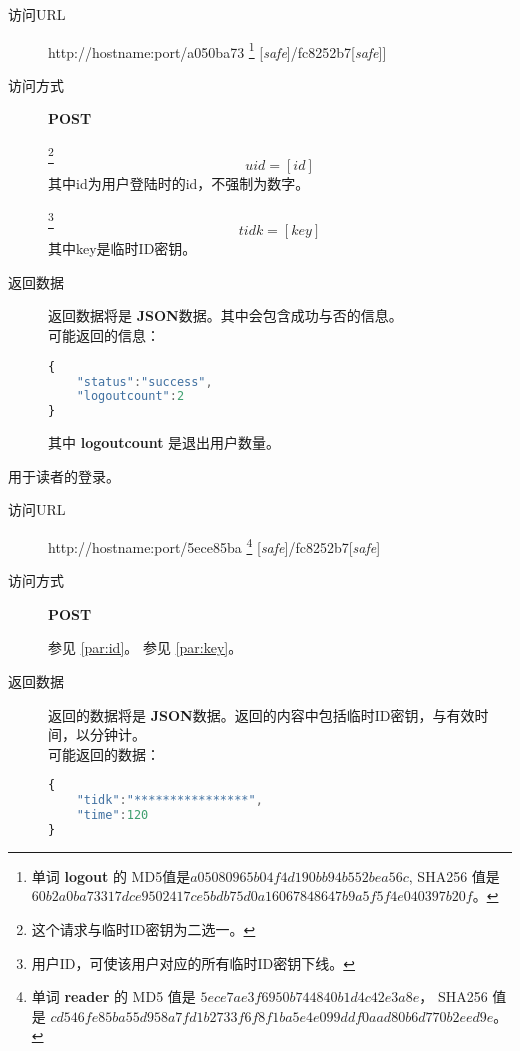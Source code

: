 \documentclass[UTF8]{ctexart}
\def\safe{[\textit{safe}]}
\def\POST{\textbf{POST}}
\def\bfJSON{\textbf{JSON}}
\def\viaurl#1{\item[访问URL] #1}
\def\viareq#1{\item[访问方式] #1}
\def\rtdata{\item[返回数据]}
\begin{document}
    \begin{description}
        \viaurl http://hostname:port/a050ba73
        \footnote{
            单词 \textbf{logout} 的
            MD5值是$a05080965b04f4d190bb94b552bea56c $,
            SHA256 值是
            $60b2a0ba73317dce9502417ce5bdb75d0a16067848647b9a5f5f4e040397b20f$。
        }
        \safe/fc8252b7\safe]
        
        \viareq \POST
        
        \label{par:logout:id}
        \footnote{这个请求与临时ID密钥为二选一。}
        $$uid=[id]$$
        其中id为用户登陆时的id，不强制为数字。
        
        \label{par:logout:tidk}
        \footnote{用户ID，可使该用户对应的所有临时ID密钥下线。}
        $$tidk=[key]$$
        其中key是临时ID密钥。
        
        \rtdata 返回数据将是 \bfJSON 数据。其中会包含成功与否的信息。
        \\可能返回的信息：
        \begin{lstlisting}[language=JavaScript]
{
    "status":"success",
    "logoutcount":2
}
        \end{lstlisting}\label{par:logout:example}
        其中 \textbf{logoutcount} 是退出用户数量。
    \end{description}
    
    
    
    
    
    
		用于读者的登录。
		\begin{description}
            
		\viaurl http://hostname:port/5ece85ba
        \footnote{单词 \textbf{reader} 的
            MD5 值是 
            $5ece7ae3f6950b744840b1d4c42e3a8e$，
            SHA256 值是
            $cd546fe85ba55d958a7fd1b2733f6f8f1ba5e4e099ddf0aad80b6d770b2eed9e$。
            }
        \safe/fc8252b7\safe
        
        \viareq \POST
        
         参见 \ref{par:id}。
         参见 \ref{par:key}。
        \rtdata 返回的数据将是 \bfJSON 数据。返回的内容中包括临时ID密钥，与有效时间，以分钟计。
        \\可能返回的数据：
        \begin{lstlisting}[language=JavaScript]
{
    "tidk":"****************",
    "time":120
}
        \end{lstlisting}
		\end{description}
        
\end{document}
